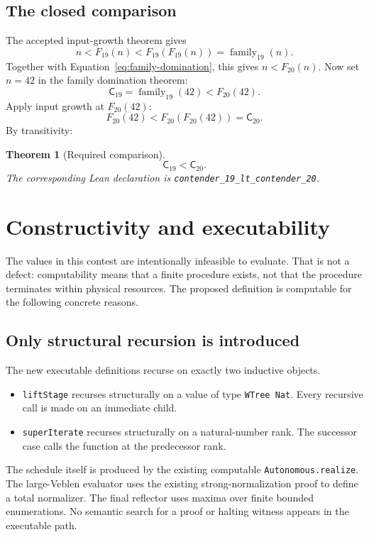 \documentclass[11pt]{article}
\newtheorem{theorem}{Theorem}[section]
\theoremstyle{definition}
\theoremstyle{remark}
\newcommand{\leanname}[1]{\nolinkurl{#1}}
\newcommand{\Cnineteen}{\mathsf{C}_{19}}
\newcommand{\Ctwenty}{\mathsf{C}_{20}}
\begin{document}
\subsection{The closed comparison}

The accepted input-growth theorem gives
\[
  n<F_{19}(n)<F_{19}(F_{19}(n))
  =\operatorname{family}_{19}(n).
\]
Together with Equation~\eqref{eq:family-domination}, this gives $n<F_{20}(n)$.
Now set $n=42$ in the family domination theorem:
\[
  \Cnineteen
  =\operatorname{family}_{19}(42)
  <F_{20}(42).
\]
Apply input growth at $F_{20}(42)$:
\[
  F_{20}(42)<F_{20}(F_{20}(42))=\Ctwenty.
\]
By transitivity:

\begin{theorem}[Required comparison]
\[
  \boxed{\Cnineteen<\Ctwenty.}
\]
The corresponding Lean declaration is
\leanname{contender_19_lt_contender_20}.
\end{theorem}

\section{Constructivity and executability}

The values in this contest are intentionally infeasible to evaluate.  That is
not a defect: computability means that a finite procedure exists, not that the
procedure terminates within physical resources.  The proposed definition is
computable for the following concrete reasons.

\subsection{Only structural recursion is introduced}

The new executable definitions recurse on exactly two inductive objects.

\begin{itemize}[leftmargin=*]
\item \leanname{liftStage} recurses structurally on a value of type
  \leanname{WTree Nat}.  Every recursive call is made on an immediate child.
\item \leanname{superIterate} recurses structurally on a natural-number rank.
  The successor case calls the function at the predecessor rank.
\end{itemize}

The schedule itself is produced by the existing computable
\leanname{Autonomous.realize}.  The large-Veblen evaluator uses the existing
strong-normalization proof to define a total normalizer.  The final reflector
uses maxima over finite bounded enumerations.  No semantic search for a proof or
halting witness appears in the executable path.
\end{document}
